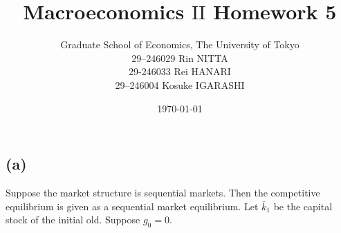 \documentclass{ltjsarticle}
\title{Macroeconomics $\mathrm{II}$ Homework 5}
\date{\today}
\author{Graduate School of Economics, The University of Tokyo\\[4mm]29--246029 Rin NITTA\\ 29-246033 Rei HANARI \\ 29--246004 Kosuke IGARASHI}
\begin{document}
\maketitle

\section{} %

\section{} %

\section{} %

\subsection*{(a)}

Suppose the market structure is sequential markets. Then the competitive equilibrium is given as a sequential market equilibrium.
Let $\bar{k}_1$ be the capital stock of the initial old. Suppose $g_0 = 0$.
\end{document}
